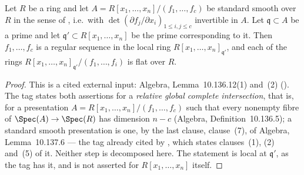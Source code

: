 \begin{lemma}
\label{lem:pc-standard-smooth-regular-sequence}
Let $R$ be a ring and let $A=R[x_1,\dots,x_n]/(f_1,\dots,f_c)$ be standard smooth over
$R$ in the sense of , i.e.\ with
$\det(\partial f_j/\partial x_i)_{1\le i,j\le c}$ invertible in $A$.  Let
$\mathfrak q\subset A$ be a prime and let $\mathfrak q'\subset R[x_1,\dots,x_n]$ be the
prime corresponding to it.  Then $f_1,\dots,f_c$ is a regular sequence in the local ring
$R[x_1,\dots,x_n]_{\mathfrak q'}$, and each of the rings
$R[x_1,\dots,x_n]_{\mathfrak q'}/(f_1,\dots,f_i)$ is flat over $R$.
\end{lemma}
\begin{proof}
This is a cited external input: Algebra, Lemma~10.136.12(1) and~(2)
().  The tag states both assertions for a \emph{relative global
complete intersection}, that is, for a presentation
$A=R[x_1,\dots,x_n]/(f_1,\dots,f_c)$ such that every nonempty fibre of
$\Spec(A)\to\Spec(R)$ has dimension $n-c$ (Algebra, Definition~10.136.5); a standard
smooth presentation is one, by the last clause, clause~(7), of Algebra,
Lemma~10.137.6 --- the tag already cited by ,
which states clauses~(1), (2) and~(5) of it.  Neither step is decomposed here.
The statement is local at $\mathfrak q'$, as the tag has it, and is not asserted for
$R[x_1,\dots,x_n]$ itself.
\end{proof}


